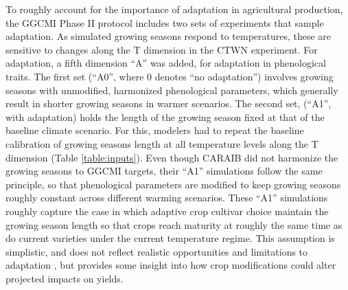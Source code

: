 \documentclass[gmd, manuscript]{copernicus} %
\begin{document}
To roughly account for the importance of adaptation in agricultural production, the GGCMI Phase II protocol includes two sets of experiments that sample adaptation. 
As simulated growing seasons respond to temperatures, these are sensitive to changes along the T dimension in the CTWN experiment. For adaptation, a fifth dimension ``A'' was added, for adaptation in phenological traits.
The first set (``A0'', where 0 denotes ``no adaptation'') involves growing seasons with unmodified, harmonized phenological parameters, which generally result in shorter growing seasons in warmer scenarios. 
The second set, (``A1'', with adaptation) holds the length of the growing season fixed at that of the baseline climate scenario. 
For this, modelers had to repeat the baseline calibration of growing seasons length at all temperature levels along the T dimension (Table \ref{table:inputs}).
Even though CARAIB did not harmonize the growing seasons to GGCMI targets, their ``A1'' simulations follow the same principle, so that phenological parameters are modified to keep growing seasons roughly constant across different warming scenarios.
These ``A1'' simulations roughly capture the case in which adaptive crop cultivar choice maintain the growing season length so that crops reach maturity at roughly the same time as do current varieties under the current temperature regime. 
This assumption is simplistic, and does not reflect realistic opportunities and limitations to adaptation \citep{vadez2012adaptation,challinor2018improving}, but provides some insight into how crop modifications could alter projected impacts on yields.
\end{document}

